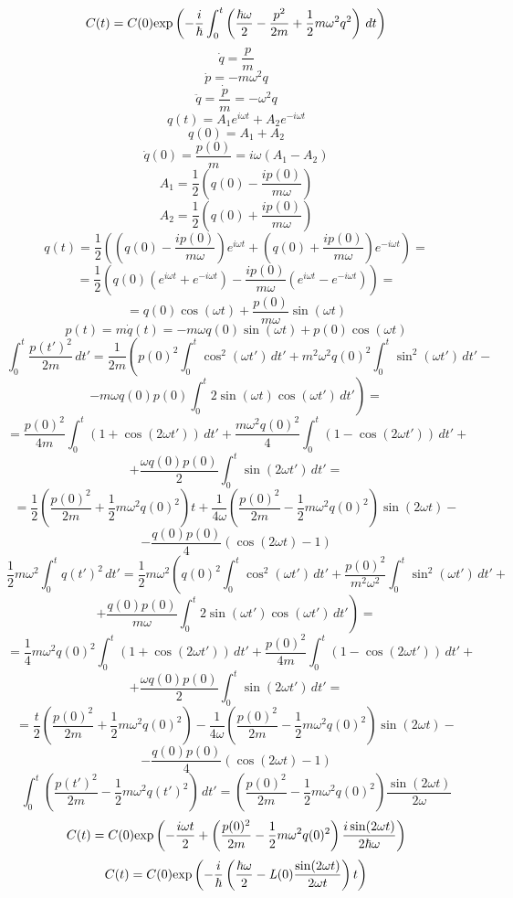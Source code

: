 $$C(t) = C(0)\text{exp}\left( -\frac{i}{\hbar}\int_0^t\left(\frac{\hbar\omega}{2}-\frac{p^2}{2m}+\frac{1}{2}m\omega^2q^2\right)\,dt \right)$$
$$\dot{q}=\frac{p}{m}$$
$$\dot{p}=-m\omega^2q$$
$$\ddot{q}=\frac{\dot{p}}{m}=-\omega^2q$$
$$q(t)=A_1 e^{i\omega t} + A_2 e^{-i\omega t} $$
$$q(0)=A_1 + A_2$$
$$\dot{q}(0)=\frac{p(0)}{m}=i\omega(A_1-A_2)$$
$$A_1 = \frac{1}{2}\left(q(0)-\frac{ip(0)}{m\omega}\right)$$
$$A_2 = \frac{1}{2}\left(q(0)+\frac{ip(0)}{m\omega}\right)$$
$$q(t) = \frac{1}{2}\left(\left(q(0)-\frac{ip(0)}{m\omega}\right)e^{i\omega t}+%
			  \left(q(0)+\frac{ip(0)}{m\omega}\right)e^{-i\omega t}\right)=$$
$$=\frac{1}{2}\left(q(0)\left(e^{i\omega t}+e^{-i\omega t}\right)-%
		    \frac{ip(0)}{m\omega}\left(e^{i\omega t}-e^{-i\omega t}\right)\right)=$$
$$=q(0)\cos(\omega t)+\frac{p(0)}{m\omega}\sin(\omega t)$$
$$p(t) = m\dot{q}(t) = -m\omega q(0)\sin(\omega t) + p(0) \cos(\omega t)$$
$$\int_0^t\frac{p(t')^2}{2m}\,dt'= \frac{1}{2m}\left(p(0)^2\int_0^t\cos^2(\omega t')\,dt'+%
						     m^2\omega^2q(0)^2\int_0^t\sin^2(\omega t')\,dt'-\right.$$
$$\left.-m\omega q(0)p(0)\int_0^t2\sin(\omega t)\cos(\omega t')\,dt'\right)=$$
$$=\frac{p(0)^2}{4m}\int_0^t(1+\cos(2\omega t'))\,dt'+\frac{m\omega^2q(0)^2}{4}\int_0^t(1-\cos(2\omega t'))\,dt'+$$
$$+\frac{\omega q(0)p(0)}{2}\int_0^t\sin(2\omega t')\,dt'=$$
$$=\frac{1}{2}\left(\frac{p(0)^2}{2m}+\frac{1}{2}m\omega^2q(0)^2\right)t+%
   \frac{1}{4\omega}\left(\frac{p(0)^2}{2m}-\frac{1}{2}m\omega^2q(0)^2\right)\sin(2\omega t)-$$
$$-\frac{q(0)p(0)}{4}(\cos(2\omega t)-1)$$
$$\frac{1}{2}m\omega^2\int_0^tq(t')^2\,dt'=\frac{1}{2}m\omega^2\left(q(0)^2\int_0^t\cos^2(\omega t')\,dt'+%
							             \frac{p(0)^2}{m^2\omega^2}\int_0^t\sin^2(\omega t')\,dt'+\right.$$
$$\left.+\frac{q(0)p(0)}{m\omega}\int_0^t2\sin(\omega t')\cos(\omega t')\,dt'\right)=$$
$$=\frac{1}{4}m\omega^2q(0)^2\int_0^t(1+\cos(2\omega t'))\,dt'+\frac{p(0)^2}{4m}\int_0^t(1-\cos(2\omega t'))\,dt'+$$
$$+\frac{\omega q(0)p(0)}{2}\int_0^t\sin(2\omega t')\,dt'=$$
$$=\frac{t}{2}\left(\frac{p(0)^2}{2m}+\frac{1}{2}m\omega^2q(0)^2\right)-%
   \frac{1}{4\omega}\left(\frac{p(0)^2}{2m}-\frac{1}{2}m\omega^2q(0)^2\right)\sin(2\omega t)-$$
$$-\frac{q(0)p(0)}{4}(\cos(2\omega t)-1)$$
$$\int_0^t\left(\frac{p(t')^2}{2m}-\frac{1}{2}m\omega^2q(t')^2\right)\,dt'=%
  \left(\frac{p(0)^2}{2m}-\frac{1}{2}m\omega^2q(0)^2\right)\frac{\sin(2\omega t)}{2\omega}$$
$$C(t) = C(0) \text{exp}\left( -\frac{i\omega t}{2}+\left(\frac{p(0)^2}{2m}-\frac{1}{2}m\omega^2q(0)^2\right)\frac{i\sin(2\omega t)}{2\hbar\omega} \right)$$
\begin{equation}
C(t)=C(0)\text{exp}\left( -\frac{i}{\hbar}\left(\frac{\hbar\omega}{2}-\mathit{L}(0)\frac{\sin(2\omega t)}{2\omega t}\right)t \right)
\label{eq:coeff}
\end{equation}
